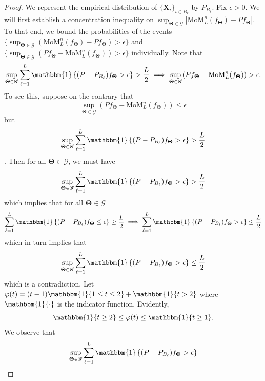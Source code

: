 \documentclass[11pt]{article}
\newcommand{\bX}{\boldsymbol{X}}
\newcommand{\bTheta}{\boldsymbol{\Theta}}
\newcommand{\cL}{\mathcal{L}}
\newcommand{\cO}{\mathcal{O}}
\newcommand{\one}{\mathbbm{1}}
\begin{document}
\begin{proof} 
We represent the empirical distribution of $\{\bX_i\}_{i \in B_\ell}$ by $P_{B_{\ell}}$. Fix $\epsilon>0$. We will first establish a concentration inequality on $\sup_{\bTheta \in \mathscr{G}} |\text{MoM}_L^n (f_{\bTheta}) - P f_{\bTheta} |$. To that end, we bound the probabilities of the events $\{\sup_{\bTheta \in \mathscr{G}}(\text{MoM}_L^n (f_{\bTheta}) - P f_{\bTheta}) >\epsilon\}$ and $\{\sup_{\bTheta \in \mathscr{G}}  ( P f_{\bTheta} - \text{MoM}_L^n (f_{\bTheta})) > \epsilon\}$ individually. Note that 
\begin{equation}
\sup_{\bTheta \in \mathscr{G}}\sum_{\ell = 1}^L \one\left\{(P-P_{B_\ell})f_{\bTheta} > \epsilon\right\} > \frac{L}{2} \implies \sup_{\bTheta \in \mathscr{G}} (P f_{\bTheta} - \text{MoM}_L^n (f_{\bTheta})) > \epsilon.
\end{equation}
To see this, suppose on the contrary that \[\sup_{\bTheta \in \mathscr{G}}  (P f_{\bTheta} - \text{MoM}_L^n (f_{\bTheta})) \le \epsilon\] but \[\sup_{\bTheta \in \mathscr{G}}\sum_{\ell = 1}^L \one\left\{(P-P_{B_\ell})f_{\bTheta} > \epsilon\right\} > \frac{L}{2}\]. 
Then for all $\bm{\Theta}\in \mathscr{G}$, we must have \[\sup_{\bTheta \in \mathscr{G}}\sum_{\ell = 1}^L \one\left\{(P-P_{B_\ell})f_{\bTheta} > \epsilon\right\} > \frac{L}{2}\] which implies that for all $\bm{\Theta}\in \mathscr{G}$ \[\sum_{\ell = 1}^L \one\left\{(P-P_{B_\ell})f_{\bTheta} \le \epsilon\right\} \ge \frac{L}{2} \implies \sum_{\ell = 1}^L \one\left\{(P-P_{B_\ell})f_{\bTheta} > \epsilon\right\} \le \frac{L}{2}\] which in turn implies that \[\sup_{\bTheta \in \mathscr{G}}\sum_{\ell = 1}^L \one\left\{(P-P_{B_\ell})f_{\bTheta} > \epsilon\right\} \le \frac{L}{2}\] which is a contradiction. Let $\varphi(t) = (t-1) \one\{1 \le t \le 2\} + \one\{t >2\}$ where $\one\{\cdot\}$ is the indicator function. Evidently,
\begin{equation}
    \label{eq6}
    \one\{t \ge 2\} \le \varphi(t) \le \one\{t \ge 1\}.
\end{equation} 
We observe that
\begingroup
\allowdisplaybreaks
\begin{align}
    \sup_{\bTheta \in \mathscr{G}}\sum_{\ell = 1}^L \one\left\{(P-P_{B_\ell})f_{\bTheta} > \epsilon\right\}

\end{align}
\end{proof}
\end{document}

